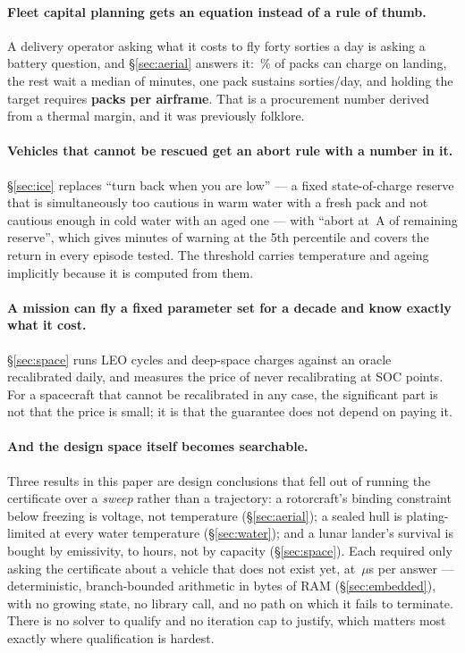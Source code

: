 \documentclass[11pt,letterpaper]{article}
\theoremstyle{definition}
\theoremstyle{remark}
\begin{document}
\paragraph{Fleet capital planning gets an equation instead of a rule of thumb.} A delivery
operator asking what it costs to fly forty sorties a day is asking a battery question, and
\S\ref{sec:aerial} answers it: \aTurnImmediate\,\% of packs can charge on landing, the rest wait
a median of \aTurnWaitMed{} minutes, one pack sustains \aTurnOnePack{} sorties/day, and holding
the target requires \textbf{\aTurnPacks{} packs per airframe}. That is a procurement number
derived from a thermal margin, and it was previously folklore.

\paragraph{Vehicles that cannot be rescued get an abort rule with a number in it.}
\S\ref{sec:ice} replaces ``turn back when you are low'' --- a fixed state-of-charge reserve that
is simultaneously too cautious in warm water with a fresh pack and not cautious enough in cold
water with an aged one --- with ``abort at \uIceThresh\,A of remaining reserve'', which gives
\uIceThreshPfive{} minutes of warning at the 5th percentile and covers the return in every
episode tested. The threshold carries temperature and ageing implicitly because it is computed
from them.

\paragraph{A mission can fly a fixed parameter set for a decade and know exactly what it cost.}
\S\ref{sec:space} runs \sLeoCycles{} LEO cycles and \sNoGroundDays{} deep-space charges against
an oracle recalibrated daily, and measures the price of never recalibrating at
\sNoGroundGap{} SOC points. For a spacecraft that cannot be recalibrated in any case, the
significant part is not that the price is small; it is that the guarantee does not depend on
paying it.

\paragraph{And the design space itself becomes searchable.} Three results in this paper are
design conclusions that fell out of running the certificate over a \emph{sweep} rather than a
trajectory: a rotorcraft's binding constraint below freezing is voltage, not temperature
(\S\ref{sec:aerial}); a sealed hull is plating-limited at every water temperature
(\S\ref{sec:water}); and a lunar lander's survival is bought by emissivity, \sNightBase{} to
\sNightBest{} hours, not by capacity (\S\ref{sec:space}). Each required only asking the
certificate about a vehicle that does not exist yet, at \worstLatency\,$\mu$s per answer ---
deterministic, branch-bounded arithmetic in \embRam{} bytes of RAM (\S\ref{sec:embedded}), with
no growing state, no library call, and no path on which it fails to terminate. There is no
solver to qualify and no iteration cap to justify, which matters most exactly where
qualification is hardest.
\end{document}
